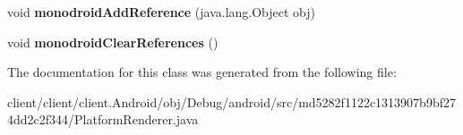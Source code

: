 \begin{DoxyCompactItemize}
\item 
\hypertarget{classmd5282f1122c1313907b9bf274dd2c2f344_1_1PlatformRenderer_a7fe5c385d2fdb987c122f44dbf30b2b0}{}void {\bfseries monodroid\+Add\+Reference} (java.\+lang.\+Object obj)\label{classmd5282f1122c1313907b9bf274dd2c2f344_1_1PlatformRenderer_a7fe5c385d2fdb987c122f44dbf30b2b0}

\item 
\hypertarget{classmd5282f1122c1313907b9bf274dd2c2f344_1_1PlatformRenderer_a829167c161244b7eb2658e674e638a9f}{}void {\bfseries monodroid\+Clear\+References} ()\label{classmd5282f1122c1313907b9bf274dd2c2f344_1_1PlatformRenderer_a829167c161244b7eb2658e674e638a9f}

\end{DoxyCompactItemize}


The documentation for this class was generated from the following file\+:\begin{DoxyCompactItemize}
\item 
client/client/client.\+Android/obj/\+Debug/android/src/md5282f1122c1313907b9bf274dd2c2f344/Platform\+Renderer.\+java\end{DoxyCompactItemize}

